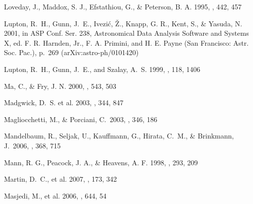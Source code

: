 \documentclass[]{emulateapj}
\begin{document}
\begin{thebibliography}{999}
Loveday, J., Maddox, S. J., Efstathiou, G., \& Peterson, B. A. 1995,
\apj, 442, 457



Lupton, R.\ H., Gunn, J.\ E., Ivezi\'{c}, \v{Z}., Knapp, G. R., Kent, S.,
\& Yasuda, N. 2001, in ASP Conf. Ser. 238, Astronomical Data Analysis
Software and Systems X, ed. F. R. Harnden, Jr., F. A. Primini, and
H. E. Payne (San Francisco: Astr. Soc. Pac.), p.\ 269 
(arXiv:astro-ph/0101420)

Lupton, R.\ H., Gunn, J.\ E., and Szalay, A.\ S. 1999, \aj, 118, 1406 

Ma, C., \& Fry, J. N. 2000, \apj, 543, 503

Madgwick, D.~S. et al. 2003, \mnras, 344, 847

Magliocchetti, M., \& Porciani, C.\ 2003, \mnras, 346, 186

Mandelbaum, R.,
Seljak, U., Kauffmann, G., Hirata, C.~M., \& Brinkmann, J.\ 2006, \mnras,
368, 715

Mann, R. G., Peacock, J. A., \& Heavens, A. F. 1998, \mnras, 293, 209


Martin, D.\ C., et al. 2007, \apjs, 173, 342

Masjedi, M., et al. 2006, \apj, 644, 54  


\end{thebibliography}
\end{document}
